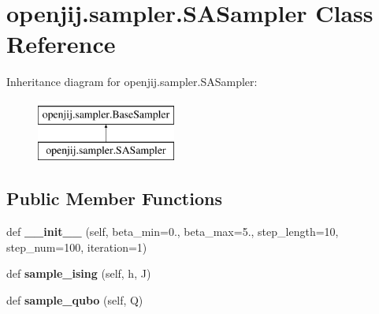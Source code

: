 \hypertarget{classopenjij_1_1sampler_1_1_s_a_sampler}{}\section{openjij.\+sampler.\+S\+A\+Sampler Class Reference}
\label{classopenjij_1_1sampler_1_1_s_a_sampler}
Inheritance diagram for openjij.\+sampler.\+S\+A\+Sampler\+:\begin{figure}[H]
\begin{center}
\leavevmode
\includegraphics[height=2.000000cm]{classopenjij_1_1sampler_1_1_s_a_sampler}
\end{center}
\end{figure}
\subsection*{Public Member Functions}
\begin{DoxyCompactItemize}
\item 
\mbox{\label{classopenjij_1_1sampler_1_1_s_a_sampler_a86f04408667101468ddf31fe2878465c}} 
def {\bfseries \+\_\+\+\_\+init\+\_\+\+\_\+} (self, beta\+\_\+min=0., beta\+\_\+max=5., step\+\_\+length=10, step\+\_\+num=100, iteration=1)
\item 
\mbox{\label{classopenjij_1_1sampler_1_1_s_a_sampler_a3b9216606a3597a4ccf048d112c13199}} 
def {\bfseries sample\+\_\+ising} (self, h, J)
\item 
\mbox{\label{classopenjij_1_1sampler_1_1_s_a_sampler_a35087b75a812f40f51cc2a0ea5a0cdce}} 
def {\bfseries sample\+\_\+qubo} (self, Q)
\end{DoxyCompactItemize}
